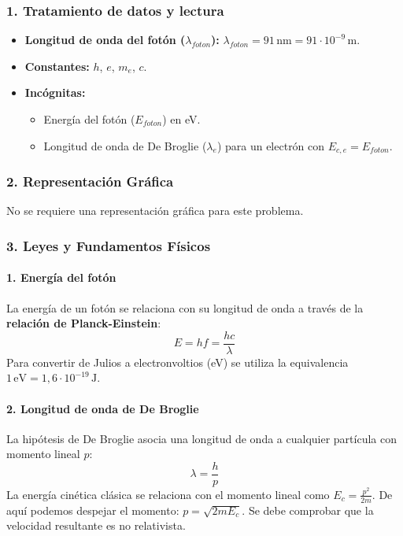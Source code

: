 \subsubsection*{1. Tratamiento de datos y lectura}
\begin{itemize}
    \item \textbf{Longitud de onda del fotón ($\lambda_{foton}$):} $\lambda_{foton} = 91 \, \text{nm} = 91 \cdot 10^{-9} \, \text{m}$.
    \item \textbf{Constantes:} $h$, $e$, $m_e$, $c$.
    \item \textbf{Incógnitas:}
        \begin{itemize}
            \item Energía del fotón ($E_{foton}$) en eV.
            \item Longitud de onda de De Broglie ($\lambda_e$) para un electrón con $E_{c,e} = E_{foton}$.
        \end{itemize}
\end{itemize}

\subsubsection*{2. Representación Gráfica}
No se requiere una representación gráfica para este problema.

\subsubsection*{3. Leyes y Fundamentos Físicos}
\paragraph{1. Energía del fotón}
La energía de un fotón se relaciona con su longitud de onda a través de la \textbf{relación de Planck-Einstein}:
$$ E = hf = \frac{hc}{\lambda} $$
Para convertir de Julios a electronvoltios (eV) se utiliza la equivalencia $1 \, \text{eV} = 1,6 \cdot 10^{-19} \, \text{J}$.

\paragraph{2. Longitud de onda de De Broglie}
La hipótesis de De Broglie asocia una longitud de onda a cualquier partícula con momento lineal $p$:
$$ \lambda = \frac{h}{p} $$
La energía cinética clásica se relaciona con el momento lineal como $E_c = \frac{p^2}{2m}$. De aquí podemos despejar el momento: $p = \sqrt{2mE_c}$. Se debe comprobar que la velocidad resultante es no relativista.

